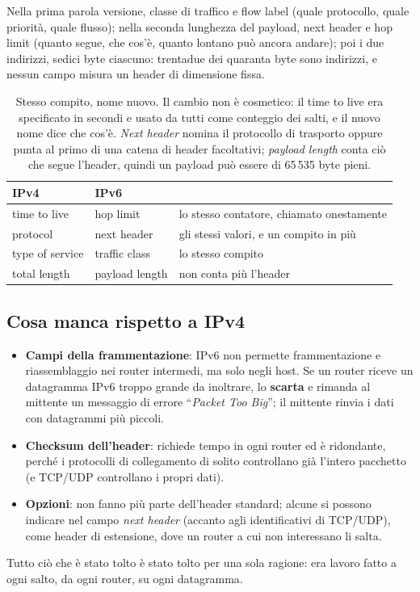 Nella prima parola versione, classe di traffico e flow label (quale protocollo, quale priorità, quale flusso); nella seconda
lunghezza del payload, next header e hop limit (quanto segue, che cos'è, quanto lontano può ancora andare); poi i due
indirizzi, sedici byte ciascuno: trentadue dei quaranta byte sono indirizzi, e nessun campo misura un header di dimensione
fissa.

\begin{table}[H]
\centering
\begin{tabular}{l l l}
\toprule
\textbf{IPv4} & \textbf{IPv6} & \\
\midrule
time to live    & hop limit      & lo stesso contatore, chiamato onestamente \\
protocol        & next header    & gli stessi valori, e un compito in più \\
type of service & traffic class  & lo stesso compito \\
total length    & payload length & non conta più l'header \\
\bottomrule
\end{tabular}
\caption{Stesso compito, nome nuovo. Il cambio non è cosmetico: il time to live era specificato in secondi e usato da tutti
         come conteggio dei salti, e il nuovo nome dice che cos'è. \emph{Next header} nomina il protocollo di trasporto
         oppure punta al primo di una catena di header facoltativi; \emph{payload length} conta ciò che segue l'header, quindi
         un payload può essere di 65\,535 byte pieni.}
\end{table}

\subsection{Cosa manca rispetto a IPv4}

\begin{itemize}
    \item \textbf{Campi della frammentazione}: IPv6 non permette frammentazione e riassemblaggio nei router intermedi, ma solo negli
          host. Se un router riceve un datagramma IPv6 troppo grande da inoltrare, lo \textbf{scarta} e rimanda al mittente un
          messaggio di errore ``\emph{Packet Too Big}''; il mittente rinvia i dati con datagrammi più piccoli.
    \item \textbf{Checksum dell'header}: richiede tempo in ogni router ed è ridondante, perché i protocolli di collegamento di
          solito controllano già l'intero pacchetto (e TCP/UDP controllano i propri dati).
    \item \textbf{Opzioni}: non fanno più parte dell'header standard; alcune si possono indicare nel campo \emph{next header}
          (accanto agli identificativi di TCP/UDP), come header di estensione, dove un router a cui non interessano li salta.
\end{itemize}
Tutto ciò che è stato tolto è stato tolto per una sola ragione: era lavoro fatto a ogni salto, da ogni router, su ogni
datagramma.

